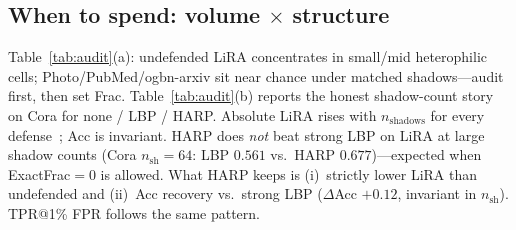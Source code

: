 \documentclass[conference]{IEEEtran}
\begin{document}
\subsection{When to spend: volume $\times$ structure}
Table~\ref{tab:audit}(a): undefended LiRA concentrates in small/mid heterophilic cells; Photo/PubMed/ogbn-arxiv sit near chance under matched shadows---audit first, then set Frac.
Table~\ref{tab:audit}(b) reports the honest shadow-count story on Cora for none / LBP / HARP.
Absolute LiRA rises with $n_{\mathrm{shadows}}$ for every defense~\cite{carlini2022membership}; Acc is invariant.
HARP does \emph{not} beat strong LBP on LiRA at large shadow counts (Cora $n_{\mathrm{sh}}{=}64$: LBP $0.561$ vs.\ HARP $0.677$)---expected when ExactFrac$=0$ is allowed.
What HARP keeps is (i)~strictly lower LiRA than undefended and (ii)~Acc recovery vs.\ strong LBP ($\Delta$Acc $+0.12$, invariant in $n_{\mathrm{sh}}$).
TPR@1\% FPR follows the same pattern.

\begin{table}[!t]
\caption{Audit controls (GraphSAGE; 3 seeds). $^\star$heterophilic. (b)~shadow scaling (not HARP-only). Acc invariant in (b): none $0.879$, LBP $0.716$, HARP $0.836$.}
\label{tab:audit}
\centering
{}
\end{table}
\end{document}
